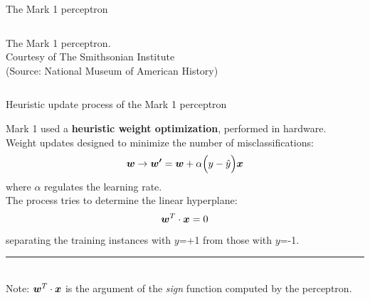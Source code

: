 \begin{frame}[t]{The Mark 1 perceptron}
\begin{columns}[t]
\begin{column}{0.50\textwidth}
\begin{center}
                {\tiny 
                The Mark 1 perceptron.\\
                \color{col:attribution} 
                Courtesy of The Smithsonian Institute\\ (Source: National Museum of American History)\\}
             \end{center}
        \end{column}
        \begin{column}{0.20\textwidth}
        \end{column}
      \end{columns}

\end{frame}

%
%
%

\begin{frame}[t]{Heuristic update process of the Mark 1 perceptron}
    
    Mark 1 used a {\bf heuristic weight optimization}, performed in hardware.\\
    \vspace{0.2cm}
    Weight updates designed to minimize the number of misclassifications:\\
    \begin{equation}
        \boldsymbol{w} \rightarrow \boldsymbol{w^\prime} = \boldsymbol{w} + \alpha \Big(y - \hat{y}\Big) \boldsymbol{x}
        \label{eq:percepton_weight_update_1}
    \end{equation}
    where $\alpha$ regulates the learning rate.\\
    \vspace{0.3cm}
    The process tries to determine the linear hyperplane: 
    \begin{equation}
        \boldsymbol{w}^T \cdot \boldsymbol{x} = 0
        \label{eq:percepton_hyperplane_1}
    \end{equation} 
    separating the training instances with $y$=+1 
    from those with $y$=-1.\\
    \vspace{0.2cm}
    \noindent\rule{4cm}{0.4pt}\\
    {\small
        Note: $\boldsymbol{w}^T \cdot \boldsymbol{x}$ 
        is the argument of the {\em sign} function computed by the 
        \gls{perceptron}.\\
    }

\end{frame}

%
%
%

